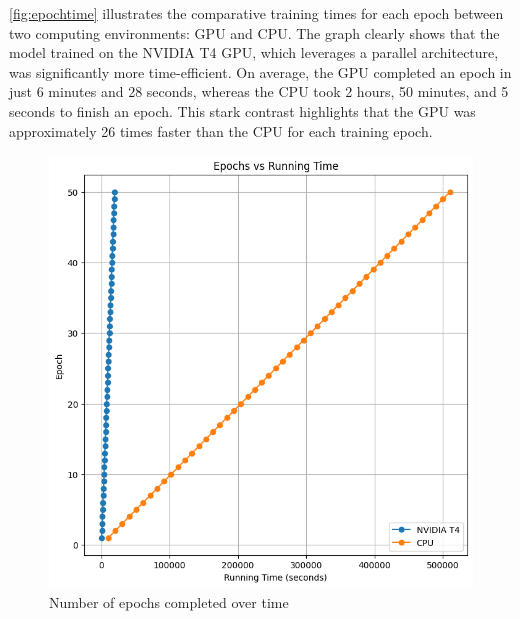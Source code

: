 \autoref{fig:epochtime} illustrates the comparative training times for each epoch between two computing environments: GPU and CPU. The graph clearly shows that the model trained on the NVIDIA T4 GPU, which leverages a parallel architecture, was significantly more time-efficient. On average, the GPU completed an epoch in just 6 minutes and 28 seconds, whereas the CPU took 2 hours, 50 minutes, and 5 seconds to finish an epoch. This stark contrast highlights that the GPU was approximately 26 times faster than the CPU for each training epoch.
\begin{figure}[!ht]
    \centering
    \includegraphics[scale=0.35]{Images/runningTime.png}
    \caption{Number of epochs completed over time}
    \label{fig:epochtime}
\end{figure}
